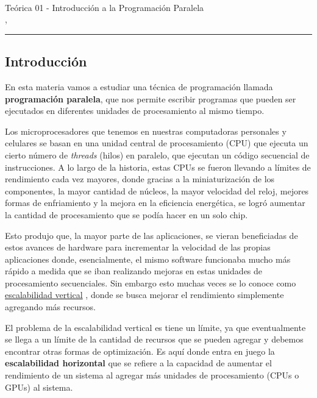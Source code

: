



\begin{center}
  \LARGE\textbf{\coursename} \\
  \Large{Teórica 01 - Introducción a la Programación Paralela} \\
  \normalsize{\currentsemester, \currentyear} \\
  \vspace{1em}
  \hrule
\end{center}

\vspace{1em}

\setcounter{section}{1}

\subsection{Introducción}
\label{sec:introduccion}

En esta materia vamos a estudiar una técnica de programación llamada \textbf{programación paralela}, que nos permite
escribir programas que pueden ser ejecutados en diferentes unidades de procesamiento al mismo tiempo.

Los microprocesadores que tenemos en nuestras computadoras personales y celulares se basan en una unidad central de
procesamiento (CPU) que ejecuta un cierto número de \textit{threads} (hilos) en paralelo, que ejecutan un código
secuencial de instrucciones. A lo largo de la historia, estas CPUs se fueron llevando a límites de rendimiento cada vez
mayores, donde gracias a la miniaturización de los componentes, la mayor cantidad de núcleos, la mayor velocidad del
reloj, mejores formas de enfriamiento y la mejora en la eficiencia energética, se logró aumentar la cantidad de
procesamiento que se podía hacer en un solo chip.

Esto produjo que, la mayor parte de las aplicaciones, se vieran beneficiadas de estos avances de hardware para
incrementar la velocidad de las propias aplicaciones donde, esencialmente, el mismo software funcionaba mucho más rápido
a medida que se iban realizando mejoras en estas unidades de procesamiento secuenciales. Sin embargo esto muchas veces
se lo conoce como \href{https://es.wikipedia.org/wiki/Escalabilidad#Escalabilidad_vertical}{escalabilidad vertical} ,
donde se busca mejorar el rendimiento simplemente agregando más recursos.

El problema de la escalabilidad vertical es tiene un límite, ya que eventualmente se llega a un límite de la cantidad
de recursos que se pueden agregar y debemos encontrar otras formas de optimización. Es aquí donde entra en juego la
\textbf{escalabilidad horizontal} que se refiere a la capacidad de aumentar el rendimiento de un sistema al agregar más
unidades de procesamiento (CPUs o GPUs) al sistema.

